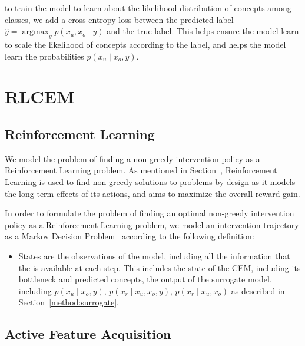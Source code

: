 \documentclass[../main.tex]{subfiles}
\begin{document}
to train the model to learn about the likelihood distribution of concepts
among classes, we add a cross entropy loss between the predicted label $\hat{y} = \mathop{\mathrm{argmax}}_y p(x_u, x_o \mid y)$ and the
true label. This helps ensure the model learn to scale the likelihood of concepts according to the 
label, and helps the model learn the probabilities $p(x_u \mid x_o, y)$.

\section{RLCEM}\label{method:rlcem}


\subsection{Reinforcement Learning}

We model the problem of finding a non-greedy intervention policy as a 
Reinforcement Learning problem. As mentioned in Section~\cite{background:rl},
Reinforcement Learning is used to find non-greedy solutions to problems
by design as it models the long-term effects of its actions, and aims to 
maximize the overall reward gain. 

In order to formulate the problem of finding an optimal non-greedy intervention policy
as a Reinforcement Learning problem, we model an intervention
trajectory as a Markov Decision Problem~\cite{rl-mdp} according
to the following definition:
\begin{itemize}
    \item States are the observations of the model, including all the information that the is available
    at each step. This includes the state of the CEM, including its bottleneck and predicted concepts,
    the output of the surrogate model, including $p(x_u \mid x_o, y)$, $p(x_r \mid x_u, x_o, y)$,
    $p(x_r \mid x_u, x_o)$ as described in Section~\ref{method:surrogate}.
\end{itemize}


\subsection{Active Feature Acquisition}
\end{document}
